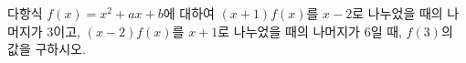 다항식 $f(x)=x^2+ax+b$에 대하여 $(x+1)f(x)$를 $x-2$로 나누었을 때의 나머지가 $3$이고, $(x-2)f(x)$를 $x+1$로 나누었을 때의 나머지가 $6$일 때, $f(3)$의 값을 구하시오. 

